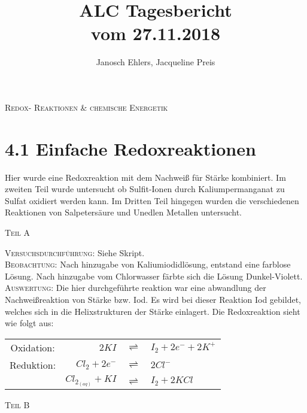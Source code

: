 \documentclass[11pt, a4paper]{article}
\begin{document}
\title{ALC Tagesbericht\\ vom 27.11.2018}
\author{Janosch Ehlers, Jacqueline Preis}
\maketitle

	\begin{center}	
	\textsc{Redox- Reaktionen \& chemische Energetik}
	\end{center}

\section{4.1 Einfache Redoxreaktionen}

Hier wurde eine Redoxreaktion mit dem Nachweiß für Stärke kombiniert. Im zweiten Teil wurde untersucht ob Sulfit-Ionen durch Kaliumpermanganat zu Sulfat oxidiert werden kann. Im Dritten Teil hingegen wurden die verschiedenen Reaktionen von Salpetersäure und Unedlen Metallen untersucht. 
\begin{center}
\textsc{Teil A}
\end{center}
\textsc{Versuchsdurchführung:} Siehe Skript.\\

\textsc{Beobachtung:}\hspace{5mm}
Nach hinzugabe von Kaliumiodidlösung, entstand eine farblose Lösung. Nach hinzugabe vom Chlorwasser färbte sich die Lösung Dunkel-Violett.\\

\textsc{Auswertung:}\hspace{8mm} Die hier durchgeführte reaktion war eine abwandlung der Nachweißreaktion von Stärke bzw. Iod. Es wird bei dieser Reaktion Iod gebildet, welches sich in die Helixstrukturen der Stärke einlagert. Die Redoxreaktion sieht wie folgt aus:\\
\begin{center}
\begin{tabular}{crcl}
Oxidation: & $2KI$ & $\displaystyle{\rightleftharpoons}$ & $I_2 + 2e^- + 2K^+$\\
Reduktion: & $Cl_2 + 2e^-$ & $\displaystyle{\rightleftharpoons}$ & $2Cl^-$\\
\hline
	& $Cl_{2_{(aq)}} + KI$ & $\displaystyle{\rightleftharpoons}$ & $I_2 + 2KCl$
\end{tabular}
\end{center}


\begin{center}
\textsc{Teil B}
\end{center}
\end{document}
